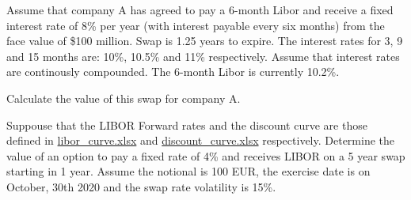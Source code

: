 \begin{question}
Assume that company A has agreed to pay a 6-month Libor and receive a fixed interest rate of 8\% per year (with interest payable every six months) from the face value of \$100 million. Swap is 1.25 years to expire. The interest rates for 3, 9 and 15 months are: 10\%, 10.5\% and 11\% respectively. Assume that interest rates are continously compounded. The 6-month Libor is currently 10.2\%. 

Calculate the value of this swap for company A.
\end{question}


%
%	
%	

\begin{question}
Suppouse that the LIBOR Forward rates and the discount curve are those defined in
\href{https://github.com/matteosan1/finance_course/raw/develop/libro/input_files/libor_curve.xlsx}{libor\_curve.xlsx} and \href{https://github.com/matteosan1/finance_course/raw/develop/libro/input_files/discount_curve.xlsx}{discount\_curve.xlsx} respectively.
Determine the value of an option to pay a fixed rate of 4\% and receives LIBOR on a 5 year swap starting in 1 year. Assume the notional is 100 EUR, the exercise date is on October, 30th 2020 and the swap rate volatility is 15\%.
\end{question}

